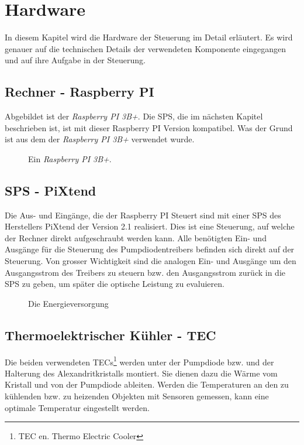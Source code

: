 \section{Hardware}
In diesem Kapitel wird die Hardware der Steuerung im Detail erläutert. Es wird genauer auf die technischen Details der verwendeten Komponente eingegangen und auf ihre Aufgabe in der Steuerung.


\subsection{Rechner - Raspberry PI}
Abgebildet ist der \textit{Raspberry PI 3B+}. Die SPS, die im nächsten Kapitel beschrieben ist, ist mit dieser Raspberry PI Version kompatibel. Was der Grund ist aus dem der \textit{Raspberry PI 3B+} verwendet wurde.

\begin{figure}
    \centering
    \caption{Ein \textit{Raspberry PI 3B+}.}
    \label{fig:raspberry_pi_3b+}
\end{figure}

\subsection{SPS - PiXtend}
Die Aus- und Eingänge, die der Raspberry PI Steuert sind mit einer SPS des Herstellers PiXtend der Version 2.1 realisiert. Dies ist eine Steuerung, auf welche der Rechner direkt aufgeschraubt werden kann. Alle benötigten Ein- und Ausgänge für die Steuerung des Pumpdiodentreibers befinden sich direkt auf der Steuerung. Von grosser Wichtigkeit sind die analogen Ein- und Ausgänge um den Ausgangsstrom des Treibers zu steuern bzw. den Ausgangsstrom zurück in die SPS zu geben, um später die optische Leistung zu evaluieren.

\begin{figure}
    \centering
    \caption{Die Energieversorgung}
    \label{fig:sps_pixtend_hw}
\end{figure}

\subsection{Thermoelektrischer Kühler - TEC}
Die beiden verwendeten TECs\footnote{TEC en. Thermo Electric Cooler} werden unter der Pumpdiode bzw. und der Halterung des Alexandritkristalls montiert. Sie dienen dazu die Wärme vom Kristall und von der Pumpdiode ableiten. Werden die Temperaturen an den zu kühlenden bzw. zu heizenden Objekten mit Sensoren gemessen, kann eine optimale Temperatur eingestellt werden.

